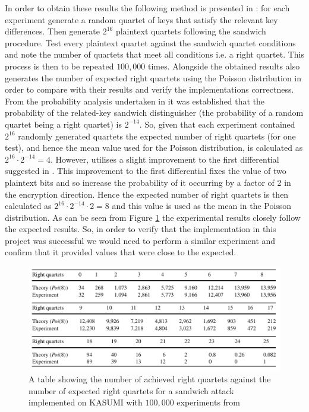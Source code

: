 \documentclass[10pt,journal,compsoc]{IEEEtran}
\begin{document}
In order to obtain these results the following method is presented in \cite{jofc-2014-25962}: for each experiment generate a random quartet of keys that satisfy the relevant key differences. Then generate \(2^{16}\) plaintext quartets following the sandwich procedure. Test every plaintext quartet against the sandwich quartet conditions and note the number of quartets that meet all conditions i.e. a right quartet. This process is then to be repeated \(100,000\) times. Alongside the obtained results \cite{jofc-2014-25962} also generates the number of expected right quartets using the Poisson distribution in order to compare with their results and verify the implementations correctness. From the probability analysis undertaken in \cite{jofc-1994-14102} it was established that the probability of the related-key sandwich distinguisher (the probability of a random quartet being a right quartet) is \(2^{-14}\). So, given that each experiment contained \(2^{16}\) randomly generated quartets the expected number of right quartets (for one test), and hence the mean value used for the Poisson distribution, is calculated as \(2^{16} \cdot 2^{-14} = 4\). However, \cite{jofc-1994-14102} utilises a slight improvement to the first differential suggested in \cite{fse-2001-3046}. This improvement to the first differential fixes the value of two plaintext bits and so increase the probability of it occurring by a factor of 2 in the encryption direction. Hence the expected number of right quartets is then calculated as \(2^{16} \cdot 2^{-14} \cdot 2 = 8\) and this value is used as the mean in the Poisson distribution. As can be seen from Figure \ref{fig:ogversand} the experimental results closely follow the expected results. So, in order to verify that the implementation in this project was successful we would need to perform a similar experiment and confirm that it provided values that were close to the expected.

\begin{figure}[hbt!]
    \centering
    \includegraphics[width=1\linewidth]{Figures/versandogpapertable.png}
    \caption{A table showing the number of achieved right quartets against the number of expected right quartets for a sandwich attack implemented on KASUMI with \(100,000\) experiments from \cite{jofc-2014-25962}}
    \label{fig:ogversand}
\end{figure}
\end{document}
